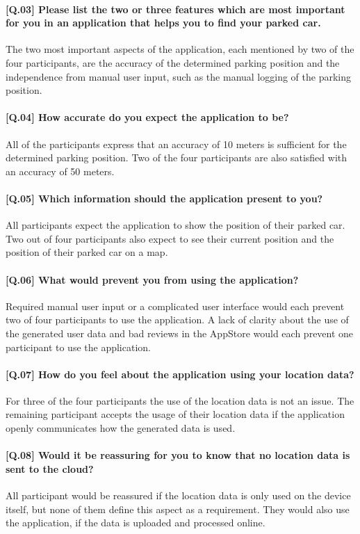 \paragraph{[Q.03] Please list the two or three features which are most important for you in an application that helps you to find your parked car.}
The two most important aspects of the application, each mentioned by two of the four participants, are the accuracy of the determined parking position and the independence from manual user input, such as the manual logging of the parking position.

\paragraph{[Q.04] How accurate do you expect the application to be?}
All of the participants express that an accuracy of 10 meters is sufficient for the determined parking position. 
Two of the four participants are also satisfied with an accuracy of 50 meters.

\paragraph{[Q.05] Which information should the application present to you?}
All participants expect the application to show the position of their parked car. Two out of four participants also expect to see their current position and the position of their parked car on a map. 

\paragraph{[Q.06] What would prevent you from using the application?}
Required manual user input or a complicated user interface would each prevent two of four participants to use the application. A lack of clarity about the use of the generated user data and bad reviews in the AppStore would each prevent one participant to use the application.

\paragraph{[Q.07] How do you feel about the application using your location data?}
For three of the four participants the use of the location data is not an issue. The remaining participant accepts the usage of their location data if the application openly communicates how the generated data is used.

\paragraph{[Q.08] Would it be reassuring for you to know that no location data is sent to the cloud? }
All participant would be reassured if the location data is only used on the device itself, but none of them define this aspect as a requirement. They would also use the application, if the data is uploaded and processed online. 

